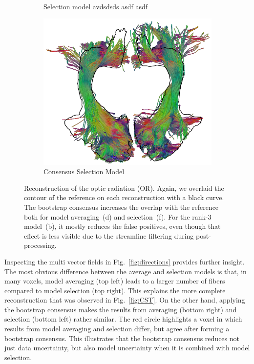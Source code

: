 \begin{figure}
\begin{minipage}{0.24\linewidth}
\begin{subfigure}[b]{\linewidth}
		\caption{Selection model {\color{white} avdsdsds asdf asdf}}
	\end{subfigure}
	\begin{subfigure}[b]{\linewidth}
		\includegraphics[width=\linewidth]{or-sel-bootstrap-c}
		\caption{Consensus Selection Model}
\end{subfigure} 
	\end{minipage}
	\caption{Reconstruction of the optic radiation (OR). Again, we overlaid the contour of the reference on each reconstruction with a black
          curve. The bootstrap consensus increases the overlap with the reference both for model averaging~(d) and selection~(f). For the rank-3 model~(b), it mostly reduces the false positives, even though that effect is less visible due to the streamline filtering during post-processing.}
	\label{fig:OR}
\end{figure}

Inspecting the multi vector fields in Fig.~\ref{fig:directions} provides further insight. The most obvious difference between the average and
selection models is that, in many voxels, model averaging (top left) leads to a larger number of fibers compared to model selection (top right). This explains the more complete reconstruction that was observed in Fig.~\ref{fig:CST}. 
On the other hand, applying the bootstrap consensus makes the results from averaging (bottom right) and selection (bottom left) rather similar. The red circle highlights a voxel in which results from model averaging and selection differ, but agree after forming a bootstrap consensus. This illustrates that the bootstrap consensus reduces not just data uncertainty, but also model uncertainty when it is combined with model selection.

